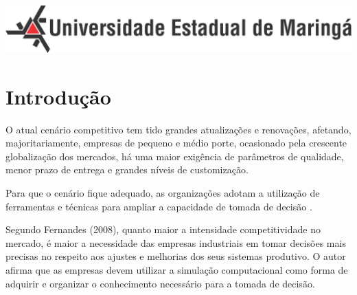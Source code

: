 \documentclass[
	12pt,				%
	openright,			%
	oneside,			%
	a4paper,			%
	english,			%
	french,				%
	spanish,			%
	brazil				%
	]{abntex2}
\begin{document}
\begin{minipage}[c][0cm][c]{0cm} %

\centering

\includegraphics[scale=0.45]{../../Pictures/uem-modelo-04.png}  
\end{minipage}


\frenchspacing 


\imprimircapa



 
 


\tableofcontents*
\cleardoublepage

\textual

\chapter{Introdução}

O atual cenário competitivo tem tido grandes atualizações e renovações, afetando, majoritariamente, empresas de pequeno e médio porte, ocasionado pela crescente globalização dos mercados, há uma maior exigência de parâmetros de qualidade, menor prazo de entrega e grandes níveis de customização. 

Para que o cenário fique adequado, as organizações adotam a utilização de ferramentas e técnicas para ampliar a capacidade de tomada de decisão \cite{ESPOSITO}.

Segundo Fernandes (2008), quanto maior a intensidade competitividade no mercado, é maior a necessidade das empresas industriais em tomar decisões mais precisas no respeito aos ajustes e melhorias dos seus sistemas produtivo. O autor afirma que as empresas devem utilizar a simulação computacional como forma de adquirir e organizar o conhecimento necessário para a tomada de decisão.
\end{document}
